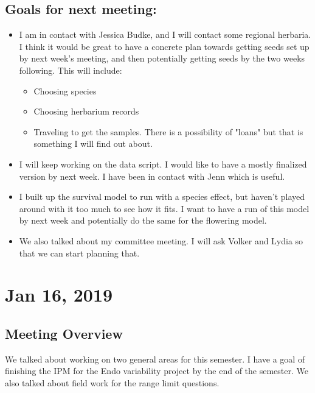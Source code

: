 \documentclass{article}
\begin{document}
\subsection*{Goals for next meeting:}
\begin{itemize}
\item{I am in contact with Jessica Budke, and I will contact some regional herbaria. I think it would be great to have a concrete plan towards getting seeds set up by next week's meeting, and then potentially getting seeds by the two weeks following. This will include:
\begin{itemize}
\item{Choosing species}
\item{Choosing herbarium records}
\item{Traveling to get the samples. There is a possibility of "loans" but that is something I will find out about.}
\end{itemize}}
\item{I will keep working on the data script. I would like to have a mostly finalized version by next week. I have been in contact with Jenn which is useful.}
\item{I built up the survival model to run with a species effect, but haven't played around with it too much to see how it fits. I want to have a run of this model by next week and potentially do the same for the flowering model.}
\item{We also talked about my committee meeting. I will ask Volker and Lydia so that we can start planning that.}
\end{itemize}


\section*{Jan 16, 2019}
\subsection*{Meeting Overview}
We talked about working on two general areas for this semester. I have a goal of finishing the IPM for the Endo variability project by the end of the semester. We also talked about field work for the range limit questions.
\end{document}
